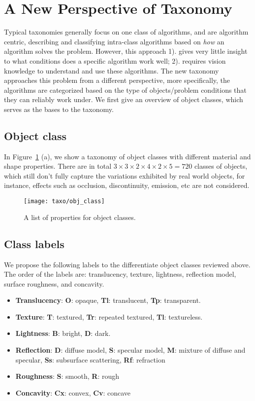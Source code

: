 \section{A New Perspective of Taxonomy}
Typical taxonomies generally focus on one class of algorithms, and are algorithm centric, describing and classifying intra-class algorithms based on \textit{how} an algorithm solves the problem. However, this approach 1). gives very little insight to what conditions does a specific algorithm work well; 2). requires vision knowledge to understand and use these algorithms. The new taxonomy approaches this problem from a different perspective, more specifically, the algorithms are categorized based on the type of objects/problem conditions that they can reliably work under. We first give an overview of object classes, which serves as the bases to the taxonomy.

\subsection{Object class}
In Figure~\ref{fig:obj_class} (a), we show a taxonomy of object classes with different material and shape properties. There are in total $3\times 3\times 2\times4\times 2\times 5 = 720$ classes of objects, which still don't fully capture the variations exhibited by real world objects, for instance, effects such as occlusion, discontinuity, emission, etc are not considered.
\begin{figure}[!htbp]
\centering
\texttt{[image: taxo/obj\_class]}\\
\caption{A list of properties for object classes.}
\label{fig:obj_class}
\end{figure}

\subsection{Class labels}
We propose the following labels to the differentiate object classes reviewed above. The order of the labels are: translucency, texture, lightness, reflection model, surface roughness, and concavity.
\begin{itemize}
\item \textbf{Translucency}: \textbf{O}: opaque, \textbf{Tl}: translucent, \textbf{Tp}: transparent.
\item \textbf{Texture}: \textbf{T}: textured, \textbf{Tr}: repeated textured, \textbf{Tl}: textureless.
\item \textbf{Lightness}: \textbf{B}: bright, \textbf{D}: dark.
\item \textbf{Reflection}: \textbf{D}: diffuse model, \textbf{S}: specular model, \textbf{M}: mixture of diffuse and specular, \textbf{Ss}: subsurface scattering, \textbf{Rf}: refraction
\item \textbf{Roughness}: \textbf{S}: smooth, \textbf{R}: rough
\item \textbf{Concavity}: \textbf{Cx}: convex, \textbf{Cv}: concave
\end{itemize}

